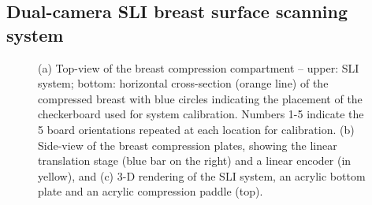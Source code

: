 \subsection{Dual-camera SLI breast surface scanning system}
\label{sec:sli}
\begin{figure}
	\begin{center}
	\end{center}
	\caption{ (a) Top-view of the breast compression compartment -- upper: SLI system; bottom: horizontal cross-section (orange line) of the compressed breast with blue circles indicating the placement of the checkerboard used for system calibration. Numbers 1-5 indicate the 5 board orientations repeated at each location for calibration. (b) Side-view of the breast compression plates, showing the linear translation stage (blue bar on the right) and a linear encoder (in yellow), and  (c) 3-D rendering of the SLI system, an acrylic bottom plate and an acrylic compression paddle (top). } 
	\label{fig:mammographysetup}
\end{figure} 
